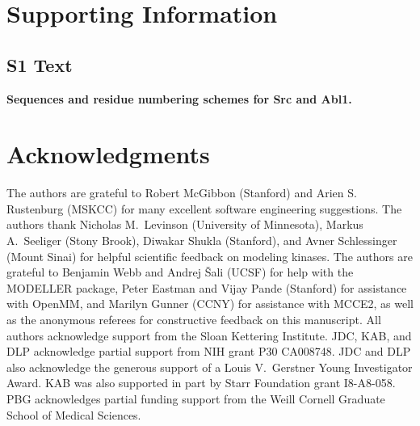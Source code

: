 \documentclass[10pt,letterpaper]{article}
\begin{document}
\section*{Supporting Information}

\subsection*{S1 Text}
\label{S1_Text}
{\bf Sequences and residue numbering schemes for Src and Abl1.}

\section*{Acknowledgments}
\label{section:acknowledgments}

The authors are grateful to Robert McGibbon (Stanford) and Arien S. Rustenburg (MSKCC) for many excellent software engineering suggestions.
The authors thank Nicholas M.~Levinson (University of Minnesota), Markus A.~Seeliger (Stony Brook), Diwakar Shukla (Stanford), and Avner Schlessinger (Mount Sinai) for helpful scientific feedback on modeling kinases.
The authors are grateful to Benjamin Webb and Andrej \v{S}ali (UCSF) for help with the MODELLER package, Peter Eastman and Vijay Pande (Stanford) for assistance with OpenMM, and Marilyn Gunner (CCNY) for assistance with MCCE2, as well as the anonymous referees for constructive feedback on this manuscript.
All authors acknowledge support from the Sloan Kettering Institute.
JDC, KAB, and DLP acknowledge partial support from NIH grant P30 CA008748.
JDC and DLP also acknowledge the generous support of a Louis V.~Gerstner Young Investigator Award.
KAB was also supported in part by Starr Foundation grant I8-A8-058.
PBG acknowledges partial funding support from the Weill Cornell Graduate School of Medical Sciences.

\nolinenumbers

%
%
% 
\end{document}
